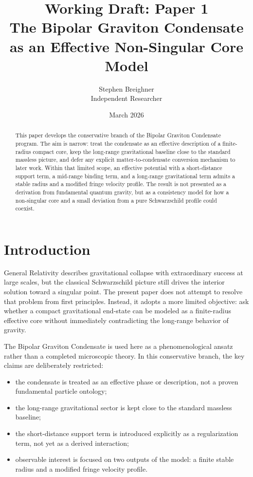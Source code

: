 \documentclass[11pt]{article}
\title{\textbf{Working Draft: Paper 1 \\ The Bipolar Graviton Condensate as an Effective Non-Singular Core Model}}
\author{Stephen Breighner \\ \small Independent Researcher}
\date{March 2026}
\begin{document}
\maketitle

\begin{abstract}
This paper develops the conservative branch of the Bipolar Graviton Condensate program. The aim is narrow: treat the condensate as an effective description of a finite-radius compact core, keep the long-range gravitational baseline close to the standard massless picture, and defer any explicit matter-to-condensate conversion mechanism to later work. Within that limited scope, an effective potential with a short-distance support term, a mid-range binding term, and a long-range gravitational term admits a stable radius and a modified fringe velocity profile. The result is not presented as a derivation from fundamental quantum gravity, but as a consistency model for how a non-singular core and a small deviation from a pure Schwarzschild profile could coexist.
\end{abstract}

\section{Introduction}
General Relativity describes gravitational collapse with extraordinary success at large scales, but the classical Schwarzschild picture still drives the interior solution toward a singular point. The present paper does not attempt to resolve that problem from first principles. Instead, it adopts a more limited objective: ask whether a compact gravitational end-state can be modeled as a finite-radius effective core without immediately contradicting the long-range behavior of gravity.

The Bipolar Graviton Condensate is used here as a phenomenological ansatz rather than a completed microscopic theory. In this conservative branch, the key claims are deliberately restricted:
\begin{itemize}[leftmargin=1.25em]
  \item the condensate is treated as an effective phase or description, not a proven fundamental particle ontology;
  \item the long-range gravitational sector is kept close to the standard massless baseline;
  \item the short-distance support term is introduced explicitly as a regularization term, not yet as a derived interaction;
  \item observable interest is focused on two outputs of the model: a finite stable radius and a modified fringe velocity profile.
\end{itemize}
\end{document}
